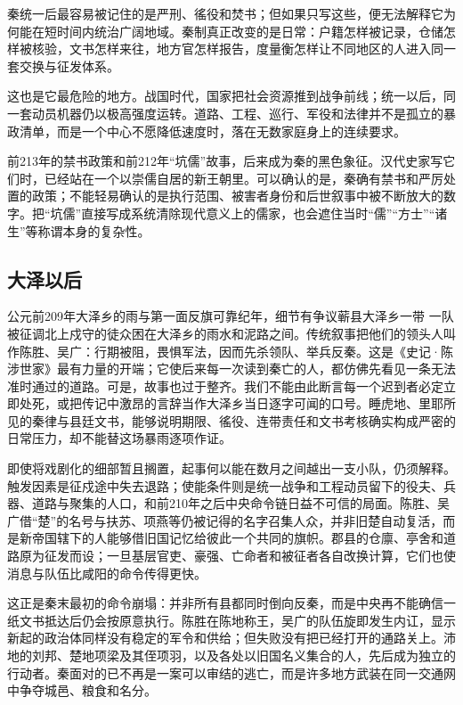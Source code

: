 秦统一后最容易被记住的是严刑、徭役和焚书；但如果只写这些，便无法解释它为何能在短时间内统治广阔地域。秦制真正改变的是日常：户籍怎样被记录，仓储怎样被核验，文书怎样来往，地方官怎样报告，度量衡怎样让不同地区的人进入同一套交换与征发体系。

这也是它最危险的地方。战国时代，国家把社会资源推到战争前线；统一以后，同一套动员机器仍以极高强度运转。道路、工程、巡行、军役和法律并不是孤立的暴政清单，而是一个中心不愿降低速度时，落在无数家庭身上的连续要求。


前213年的禁书政策和前212年“坑儒”故事，后来成为秦的黑色象征。汉代史家写它们时，已经站在一个以崇儒自居的新王朝里。可以确认的是，秦确有禁书和严厉处置的政策；不能轻易确认的是执行范围、被害者身份和后世叙事中被不断放大的数字。把“坑儒”直接写成系统清除现代意义上的儒家，也会遮住当时“儒”“方士”“诸生”等称谓本身的复杂性。

\subsection{大泽以后}

\begin{event}{公元前209年}{大泽乡的雨与第一面反旗}{可靠纪年，细节有争议}{蕲县大泽乡一带}
一队被征调北上戍守的徒众困在大泽乡的雨水和泥路之间。传统叙事把他们的领头人叫作陈胜、吴广：行期被阻，畏惧军法，因而先杀领队、举兵反秦。这是《史记·陈涉世家》最有力量的开端；它使后来每一次读到秦亡的人，都仿佛先看见一条无法准时通过的道路。可是，故事也过于整齐。我们不能由此断言每一个迟到者必定立即处死，或把传记中激昂的言辞当作大泽乡当日逐字可闻的口号。睡虎地、里耶所见的秦律与县廷文书，能够说明期限、徭役、连带责任和文书考核确实构成严密的日常压力，却不能替这场暴雨逐项作证。

即使将戏剧化的细部暂且搁置，起事何以能在数月之间越出一支小队，仍须解释。触发因素是征戍途中失去退路；使能条件则是统一战争和工程动员留下的役夫、兵器、道路与聚集的人口，和前210年之后中央命令链日益不可信的局面。陈胜、吴广借“楚”的名号与扶苏、项燕等仍被记得的名字召集人众，并非旧楚自动复活，而是新帝国辖下的人能够借旧国记忆给彼此一个共同的旗帜。郡县的仓廪、亭舍和道路原为征发而设；一旦基层官吏、豪强、亡命者和被征者各自改换计算，它们也使消息与队伍比咸阳的命令传得更快。

这正是秦末最初的命令崩塌：并非所有县都同时倒向反秦，而是中央再不能确信一纸文书抵达后仍会按原意执行。陈胜在陈地称王，吴广的队伍旋即发生内讧，显示新起的政治体同样没有稳定的军令和供给；但失败没有把已经打开的通路关上。沛地的刘邦、楚地项梁及其侄项羽，以及各处以旧国名义集合的人，先后成为独立的行动者。秦面对的已不再是一案可以审结的逃亡，而是许多地方武装在同一交通网中争夺城邑、粮食和名分。
\end{event}

